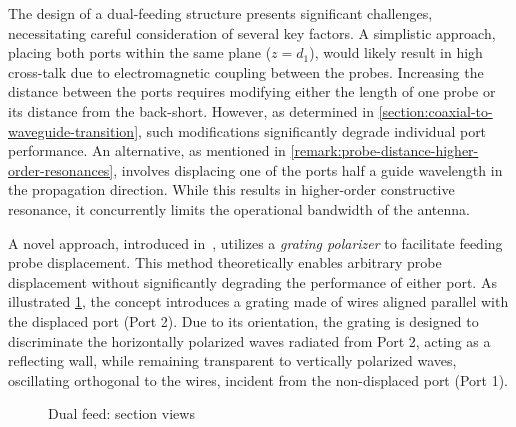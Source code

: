\documentclass[11pt,a4paper,twoside,openany]{report}
\newlength{\twosubht}
\begin{document}
The design of a dual-feeding structure presents significant challenges, necessitating careful consideration of several key factors. A simplistic approach, placing both ports within the same plane ($z = d_1$), would likely result in high cross-talk due to electromagnetic coupling between the probes. Increasing the distance between the ports requires modifying either the length of one probe or its distance from the back-short. However, as determined in \cref{section:coaxial-to-waveguide-transition}, such modifications significantly degrade individual port performance. An alternative, as mentioned in \cref{remark:probe-distance-higher-order-resonances}, involves displacing one of the ports half a guide wavelength in the propagation direction. While this results in higher-order constructive resonance, it concurrently limits the operational bandwidth of the antenna.

A novel approach, introduced in~\parencite{karki-et-al:dual-polarized-probe-for-planar-near-field-measurement}, utilizes a \emph{grating polarizer} to facilitate feeding probe displacement. This method theoretically enables arbitrary probe displacement without significantly degrading the performance of either port. As illustrated \cref{fig:dual-feed-model}, the concept introduces a grating made of wires aligned parallel with the displaced port (Port 2). Due to its orientation, the grating is designed to discriminate the horizontally polarized waves radiated from Port 2, acting as a reflecting wall, while remaining transparent to vertically polarized waves, oscillating orthogonal to the wires, incident from the non-displaced port (Port 1).

\begin{figure}[bh]
    \sbox{}
    \setlength{\twosubht}{\ht\twosubbox}

    \centering
    \quad
    \caption{\label{fig:dual-feed-model}Dual feed: section views}
\end{figure}
\end{document}

